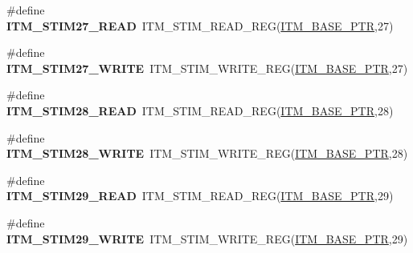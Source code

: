 \begin{DoxyCompactItemize}
\item 
\hypertarget{group___i_t_m___register___accessor___macros_gad396bfbe5ecd26d08ddcdeb9102e28d2}{}\#define {\bfseries I\+T\+M\+\_\+\+S\+T\+I\+M27\+\_\+\+R\+E\+A\+D}~I\+T\+M\+\_\+\+S\+T\+I\+M\+\_\+\+R\+E\+A\+D\+\_\+\+R\+E\+G(\hyperlink{group___i_t_m___peripheral_gafaddee8fe8b6a898d4e5edc43ee0d703}{I\+T\+M\+\_\+\+B\+A\+S\+E\+\_\+\+P\+T\+R},27)\label{group___i_t_m___register___accessor___macros_gad396bfbe5ecd26d08ddcdeb9102e28d2}

\item 
\hypertarget{group___i_t_m___register___accessor___macros_gae1575242a2ddb0a6d0089f2f49072265}{}\#define {\bfseries I\+T\+M\+\_\+\+S\+T\+I\+M27\+\_\+\+W\+R\+I\+T\+E}~I\+T\+M\+\_\+\+S\+T\+I\+M\+\_\+\+W\+R\+I\+T\+E\+\_\+\+R\+E\+G(\hyperlink{group___i_t_m___peripheral_gafaddee8fe8b6a898d4e5edc43ee0d703}{I\+T\+M\+\_\+\+B\+A\+S\+E\+\_\+\+P\+T\+R},27)\label{group___i_t_m___register___accessor___macros_gae1575242a2ddb0a6d0089f2f49072265}

\item 
\hypertarget{group___i_t_m___register___accessor___macros_gaeedb9934131b7f1d727aab5f0282751f}{}\#define {\bfseries I\+T\+M\+\_\+\+S\+T\+I\+M28\+\_\+\+R\+E\+A\+D}~I\+T\+M\+\_\+\+S\+T\+I\+M\+\_\+\+R\+E\+A\+D\+\_\+\+R\+E\+G(\hyperlink{group___i_t_m___peripheral_gafaddee8fe8b6a898d4e5edc43ee0d703}{I\+T\+M\+\_\+\+B\+A\+S\+E\+\_\+\+P\+T\+R},28)\label{group___i_t_m___register___accessor___macros_gaeedb9934131b7f1d727aab5f0282751f}

\item 
\hypertarget{group___i_t_m___register___accessor___macros_gadf3581234ae31f01dc8bbc5fe2d5fa06}{}\#define {\bfseries I\+T\+M\+\_\+\+S\+T\+I\+M28\+\_\+\+W\+R\+I\+T\+E}~I\+T\+M\+\_\+\+S\+T\+I\+M\+\_\+\+W\+R\+I\+T\+E\+\_\+\+R\+E\+G(\hyperlink{group___i_t_m___peripheral_gafaddee8fe8b6a898d4e5edc43ee0d703}{I\+T\+M\+\_\+\+B\+A\+S\+E\+\_\+\+P\+T\+R},28)\label{group___i_t_m___register___accessor___macros_gadf3581234ae31f01dc8bbc5fe2d5fa06}

\item 
\hypertarget{group___i_t_m___register___accessor___macros_ga91514a35de0d63d08518557abf3a4092}{}\#define {\bfseries I\+T\+M\+\_\+\+S\+T\+I\+M29\+\_\+\+R\+E\+A\+D}~I\+T\+M\+\_\+\+S\+T\+I\+M\+\_\+\+R\+E\+A\+D\+\_\+\+R\+E\+G(\hyperlink{group___i_t_m___peripheral_gafaddee8fe8b6a898d4e5edc43ee0d703}{I\+T\+M\+\_\+\+B\+A\+S\+E\+\_\+\+P\+T\+R},29)\label{group___i_t_m___register___accessor___macros_ga91514a35de0d63d08518557abf3a4092}

\item 
\hypertarget{group___i_t_m___register___accessor___macros_gaf42116fa71e252ae421c078e1de7058b}{}\#define {\bfseries I\+T\+M\+\_\+\+S\+T\+I\+M29\+\_\+\+W\+R\+I\+T\+E}~I\+T\+M\+\_\+\+S\+T\+I\+M\+\_\+\+W\+R\+I\+T\+E\+\_\+\+R\+E\+G(\hyperlink{group___i_t_m___peripheral_gafaddee8fe8b6a898d4e5edc43ee0d703}{I\+T\+M\+\_\+\+B\+A\+S\+E\+\_\+\+P\+T\+R},29)\label{group___i_t_m___register___accessor___macros_gaf42116fa71e252ae421c078e1de7058b}


\end{DoxyCompactItemize}
